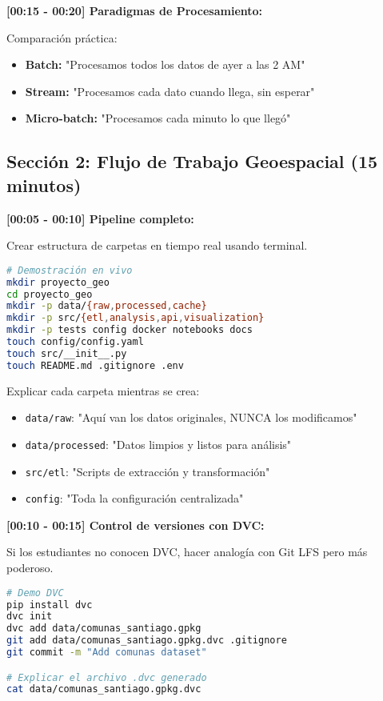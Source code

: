 \documentclass[11pt,a4paper]{article}
\begin{document}
\textbf{[00:15 - 00:20] Paradigmas de Procesamiento:}

Comparación práctica:
\begin{itemize}
    \item \textbf{Batch:} "Procesamos todos los datos de ayer a las 2 AM"
    \item \textbf{Stream:} "Procesamos cada dato cuando llega, sin esperar"
    \item \textbf{Micro-batch:} "Procesamos cada minuto lo que llegó"
\end{itemize}

\subsection{Sección 2: Flujo de Trabajo Geoespacial (15 minutos)}

\textbf{[00:05 - 00:10] Pipeline completo:}

\begin{demobox}
Crear estructura de carpetas en tiempo real usando terminal.
\end{demobox}

\begin{lstlisting}[language=bash]
# Demostración en vivo
mkdir proyecto_geo
cd proyecto_geo
mkdir -p data/{raw,processed,cache}
mkdir -p src/{etl,analysis,api,visualization}
mkdir -p tests config docker notebooks docs
touch config/config.yaml
touch src/__init__.py
touch README.md .gitignore .env
\end{lstlisting}

Explicar cada carpeta mientras se crea:
\begin{itemize}
    \item \texttt{data/raw}: "Aquí van los datos originales, NUNCA los modificamos"
    \item \texttt{data/processed}: "Datos limpios y listos para análisis"
    \item \texttt{src/etl}: "Scripts de extracción y transformación"
    \item \texttt{config}: "Toda la configuración centralizada"
\end{itemize}

\textbf{[00:10 - 00:15] Control de versiones con DVC:}

\begin{tipbox}
Si los estudiantes no conocen DVC, hacer analogía con Git LFS pero más poderoso.
\end{tipbox}

\begin{lstlisting}[language=bash]
# Demo DVC
pip install dvc
dvc init
dvc add data/comunas_santiago.gpkg
git add data/comunas_santiago.gpkg.dvc .gitignore
git commit -m "Add comunas dataset"

# Explicar el archivo .dvc generado
cat data/comunas_santiago.gpkg.dvc
\end{lstlisting}
\end{document}
